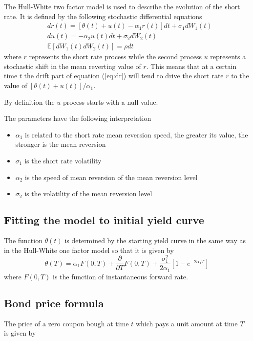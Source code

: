 The Hull-White two factor model is used to describe the evolution of the short rate. It is defined by the following stochastic differential equations
\begin{align}
& dr(t) = \left[ \theta(t) + u(t) - \alpha_1 r(t)\right]dt + \sigma_1 dW_1(t)\label{eq:dr}\\
& du(t) = -\alpha_2 u(t)dt + \sigma_2 dW_2(t)\\
& \mathbb{E}[dW_1(t)dW_2(t)] = \rho dt
\end{align}
where $r$ represents the short rate process while the second process $u$ represents a stochastic shift in the mean reverting value of $r$. This means that at a certain time $t$ the drift part of equation (\ref{eq:dr}) will tend to drive the short rate $r$ to the value of $[\theta(t) + u(t)]/\alpha_1$.

By definition the $u$ process starts with a null value.

The parameters have the following interpretation
\begin{itemize}
\item $\alpha_1$ is related to the short rate mean reversion speed, the greater its value, the stronger is the mean reversion
\item $\sigma_1$ is the short rate volatility
\item $\alpha_2$ is the speed of mean reversion of the mean reversion level
\item $\sigma_2$ is the volatility of the mean reversion level
\end{itemize}

\subsection{Fitting the model to initial yield curve}

The function $\theta(t)$ is determined by the starting yield curve in the same way as in the Hull-White one factor model so that it is given by
\begin{equation}
\theta(T) = \alpha_1 F(0,T)+\frac{\partial}{\partial T}F(0,T)+\frac{\sigma_1^2}{2\alpha_1}\left[1-e^{-2\alpha_1T}\right]
\end{equation}
where $F(0,T)$ is the function of instantaneous forward rate.

\subsection{Bond price formula}

The price of a zero coupon bough at time $t$ which pays a unit amount at time $T$ is given by

